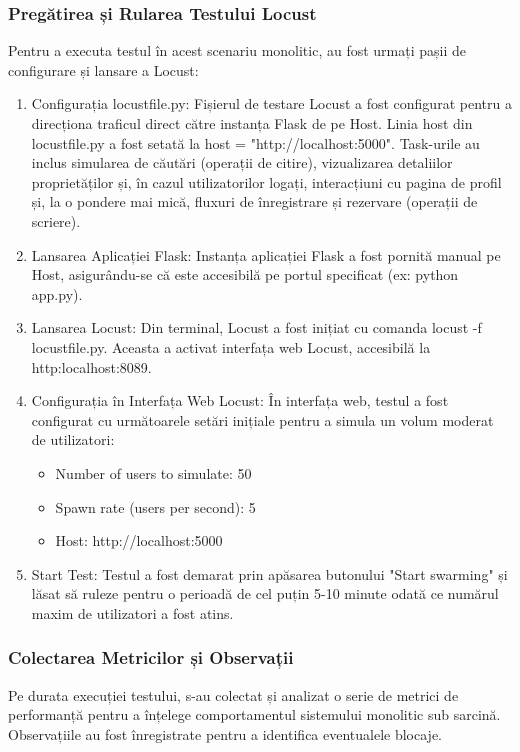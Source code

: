 \documentclass[12pt, a4paper, oneside, romanian]{teza-upb}
\begin{document}
\subsubsection{Pregătirea și Rularea Testului Locust}
Pentru a executa testul în acest scenariu monolitic, au fost urmați pașii de configurare și lansare a Locust:
\begin{enumerate}
	\item Configurația locustfile.py: Fișierul de testare Locust a fost configurat pentru a direcționa traficul direct către instanța Flask de pe Host. Linia host din locustfile.py a fost setată la host = "http://localhost:5000". Task-urile au inclus simularea de căutări (operații de citire), vizualizarea detaliilor proprietăților și, în cazul utilizatorilor logați, interacțiuni cu pagina de profil și, la o pondere mai mică, fluxuri de înregistrare și rezervare (operații de scriere).
	\item Lansarea Aplicației Flask: Instanța aplicației Flask a fost pornită manual pe Host, asigurându-se că este accesibilă pe portul specificat (ex: python app.py).
	\item Lansarea Locust: Din terminal, Locust a fost inițiat cu comanda locust -f locustfile.py. Aceasta a activat interfața web Locust, accesibilă la http:\/\/localhost:8089.
	\item Configurația în Interfața Web Locust: În interfața web, testul a fost configurat cu următoarele setări inițiale pentru a simula un volum moderat de utilizatori:
	\begin{itemize}
		\item Number of users to simulate: 50
		\item Spawn rate (users per second): 5
		\item Host: http://localhost:5000
	\end{itemize}
	\item Start Test: Testul a fost demarat prin apăsarea butonului "Start swarming" și lăsat să ruleze pentru o perioadă de cel puțin 5-10 minute odată ce numărul maxim de utilizatori a fost atins.
	
\end{enumerate}

\subsubsection{Colectarea Metricilor și Observații}

Pe durata execuției testului, s-au colectat și analizat o serie de metrici de performanță pentru a înțelege comportamentul sistemului monolitic sub sarcină. Observațiile au fost înregistrate pentru a identifica eventualele blocaje.
\end{document}
